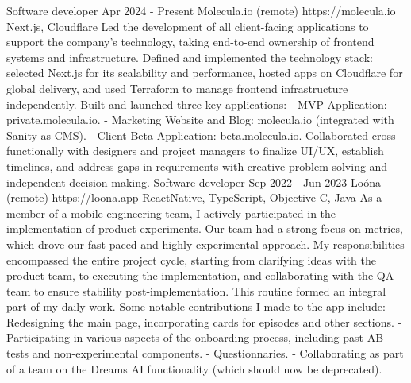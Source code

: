 \documentclass[11pt,a4paper,sans]{awesomecv}
\begin{document}
\begin{cventries}
  \cventry
    {Software developer}
    {Apr 2024 - Present}
    {Molecula.io (remote)}
    {https://molecula.io}
    {
      \cvproject
        {}{}{}
        {Next.js, Cloudflare}
        {
          Led the development of all client-facing applications to support the company's technology, 
          taking end-to-end ownership of frontend systems and infrastructure.
          \hfill \break
          \hfill \break
          Defined and implemented the technology stack: selected Next.js for its scalability and performance, 
          hosted apps on Cloudflare for global delivery, and used Terraform to manage frontend infrastructure independently.
          \hfill \break
          \hfill \break
          Built and launched three key applications:
          - MVP Application: private.molecula.io.\hfill \break
          - Marketing Website and Blog: molecula.io (integrated with Sanity as CMS).\hfill \break
          - Client Beta Application: beta.molecula.io.
          \hfill \break
          \hfill \break
          Collaborated cross-functionally with designers and project managers to finalize UI/UX, 
          establish timelines, and address gaps in requirements with creative problem-solving and independent decision-making.
          \hfill \break
        }
    }
\cventry
    {Software developer}
    {Sep 2022 - Jun 2023}
    {Loóna (remote)}
    {https://loona.app}
    {
      \cvproject
        {}{}{}
        {ReactNative, TypeScript, Objective-C, Java}
        {
          As a member of a mobile engineering team, 
          I actively participated in the implementation of product experiments. 
          Our team had a strong focus on metrics, which drove our fast-paced and 
          highly experimental approach. 
          My responsibilities encompassed the entire project cycle, 
          starting from clarifying ideas with the product team, 
          to executing the implementation, and collaborating with the QA team to 
          ensure stability post-implementation. This routine formed an integral part of my daily work.
          \hfill \break
          \hfill \break
          Some notable contributions I made to the app include:
          - Redesigning the main page, incorporating cards for episodes and other sections.\hfill \break
          - Participating in various aspects of the onboarding process, including past AB tests and non-experimental components.\hfill \break
          - Questionnaries.\hfill \break
          - Collaborating as part of a team on the Dreams AI functionality (which should now be deprecated).\hfill \break
}}
\end{cventries}
\end{document}
